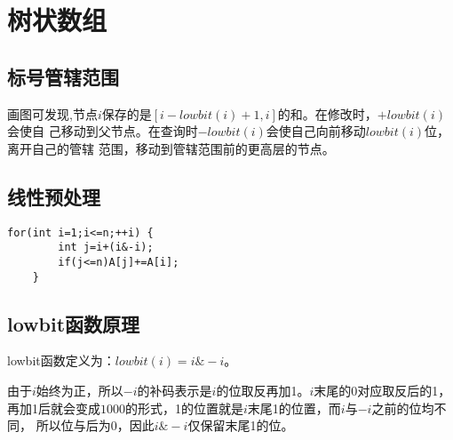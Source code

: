 \section{树状数组}
\subsection{标号管辖范围}

画图可发现,节点$i$保存的是$[i-lowbit(i)+1,i]$的和。在修改时，$+lowbit(i)$会使自
己移动到父节点。在查询时$-lowbit(i)$会使自己向前移动$lowbit(i)$位，离开自己的管辖
范围，移动到管辖范围前的更高层的节点。

\subsection{线性预处理}

\begin{lstlisting}[title=LinearBuild]
    for(int i=1;i<=n;++i) {
        int j=i+(i&-i);
        if(j<=n)A[j]+=A[i];
    }
\end{lstlisting}

\subsection{lowbit函数原理}

lowbit函数定义为：$lowbit(i)=i\&-i$。

由于$i$始终为正，所以$-i$的补码表示是$i$的位取反再加1。$i$末尾的0对应取反后的1，
再加1后就会变成$1000$的形式，1的位置就是$i$末尾1的位置，而$i$与$-i$之前的位均不同，
所以位与后为0，因此$i\&-i$仅保留末尾1的位。

